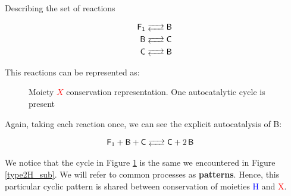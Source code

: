 \documentclass{article}
\begin{document}
Describing the set of reactions

\begin{equation}
		\begin{split}
  \ce{\textsf{F}_1 & <--> \textsf{B} }	\\
  \ce{\textsf{B} & <-->  \textsf{C} } \\
  \ce{\textsf{C} & <-->  \textsf{B}}
		\end{split} 
\end{equation}

This reactions can be represented as:

\begin{figure}[H]
\begin{center}
\caption{Moiety \textcolor{red}{$X$} conservation representation. One autocatalytic cycle is present}
\label{type2X}
\end{center}
\end{figure}

Again, taking each reaction once, we can see the explicit autocatalysis of B:

\begin{equation}
		\begin{split}
  \ce{\textsf{F}_1 + \textsf{B} + \textsf{C} & <--> \textsf{C} + 2\textsf{B} }
		\end{split} 
\end{equation}

We notice that the cycle in Figure \ref{type2X} is the same we encountered in Figure \ref{type2H_sub}. We will refer to common processes as \textbf{patterns}. Hence, this particular cyclic pattern is shared between conservation of moieties \textcolor{blue}{H} and \textcolor{red}{X}. \\
\end{document}
